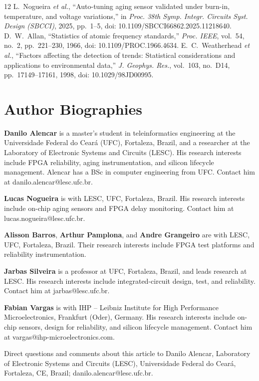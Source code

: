 \documentclass[10pt,twocolumn]{article}
\begin{document}
\begin{thebibliography}{12}
 L.~Nogueira \emph{et al.}, ``Auto-tuning aging sensor validated under burn-in, temperature, and voltage variations,'' in \emph{Proc. 38th Symp. Integr. Circuits Syst. Design (SBCCI)}, 2025, pp.~1--5, doi: 10.1109/SBCCI66862.2025.11218640.
 D.~W.~Allan, ``Statistics of atomic frequency standards,'' \emph{Proc. IEEE}, vol.~54, no.~2, pp.~221--230, 1966, doi: 10.1109/PROC.1966.4634.
 E.~C.~Weatherhead \emph{et al.}, ``Factors affecting the detection of trends: Statistical considerations and applications to environmental data,'' \emph{J. Geophys. Res.}, vol.~103, no.~D14, pp.~17149--17161, 1998, doi: 10.1029/98JD00995.
\end{thebibliography}

\section*{Author Biographies}
\footnotesize
\noindent\textbf{Danilo Alencar} is a master's student in teleinformatics engineering at the Universidade Federal do Cear\'a (UFC), Fortaleza, Brazil, and a researcher at the Laboratory of Electronic Systems and Circuits (LESC). His research interests include FPGA reliability, aging instrumentation, and silicon lifecycle management. Alencar has a BSc in computer engineering from UFC. Contact him at danilo.alencar@lesc.ufc.br.

\smallskip\noindent\textbf{Lucas Nogueira} is with LESC, UFC, Fortaleza, Brazil. His research interests include on-chip aging sensors and FPGA delay monitoring. Contact him at lucas.nogueira@lesc.ufc.br.

\smallskip\noindent\textbf{Alisson Barros}, \textbf{Arthur Pamplona}, and \textbf{Andre Grangeiro} are with LESC, UFC, Fortaleza, Brazil. Their research interests include FPGA test platforms and reliability instrumentation.

\smallskip\noindent\textbf{Jarbas Silveira} is a professor at UFC, Fortaleza, Brazil, and leads research at LESC. His research interests include integrated-circuit design, test, and reliability. Contact him at jarbas@lesc.ufc.br.

\smallskip\noindent\textbf{Fabian Vargas} is with IHP -- Leibniz Institute for High Performance Microelectronics, Frankfurt (Oder), Germany. His research interests include on-chip sensors, design for reliability, and silicon lifecycle management. Contact him at vargas@ihp-microelectronics.com.

\medskip\noindent Direct questions and comments about this article to Danilo Alencar, Laboratory of Electronic Systems and Circuits (LESC), Universidade Federal do Cear\'a, Fortaleza, CE, Brazil; danilo.alencar@lesc.ufc.br.
\end{document}
